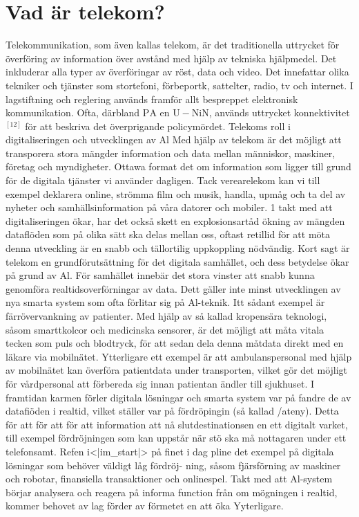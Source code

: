 {{\section*{Vad är telekom?}
Telekommunikation, som även kallas telekom, är det traditionella uttrycket för överföring av information över avstånd med hjälp av tekniska hjälpmedel. Det inkluderar alla typer av överföringar av röst, data och video. Det innefattar olika tekniker och tjänster som stortefoni, förbeportk, sattelter, radio, tv och internet. I lagstiftning och reglering används framför allt bespreppet elektronisk kommunikation. Ofta, därbland \(\mathrm{PA}\) en \(\mathrm{U}-\mathrm{NiN}\), används uttrycket konnektivitet \({ }^{[12]}\) för att beskriva det överprigande policymördet.
Telekoms roll i digitaliseringen och utvecklingen av Al
Med hjälp av telekom är det möjligt att transporera stora mängder information och data mellan människor, maskiner, företag och myndigheter. Ottawa format det om information som ligger till grund för de digitala tjänster vi använder dagligen. Tack verearelekom kan vi till exempel deklarera online, strömma film och musik, handla, upmåg och ta del av nyheter och samhällsinformation på våra datorer och mobiler.
1 takt med att digitaliseringen ökar, har det också skett en explosionsartåd ökning av mängden dataflöden som på olika sätt ska delas mellan oss, oftast retillid för att möta denna utveckling är en snabb och tällortilig uppkoppling nödvändig. Kort sagt är telekom en grundförutsättning för det digitala samhället, och dess betydelse ökar på grund av Al.
För samhället innebär det stora vinster att snabb kunna genomföra realtidsoverförningar av data. Dett gäller inte minst utvecklingen av nya smarta system som ofta förlitar sig på Al-teknik. Itt sådant exempel är färrövervankning av patienter. Med hjälp av så kallad kropensära teknologi, såsom smarttkolcor och medicinska sensorer, är det möjligt att måta vitala tecken som puls och blodtryck, för att sedan dela denna måtdata direkt med en läkare via mobilnätet. Ytterligare ett exempel är att ambulanspersonal med hjälp av mobilnätet kan överföra patientdata under transporten, vilket gör det möjligt för vårdpersonal att förbereda sig innan patientan ändler till sjukhuset.
I framtidan karmen förler digitala lösningar och smarta system var på fandre de av datafiöden i realtid, vilket ställer var på fördröpingin (så kallad /ateny). Detta för att för att för att information att nå slutdestinationsen en ett digitalt varket, till exempel fördröjningen som kan uppstår när stö ska må nottagaren under ett telefonsamt. Refen i<|im_start|> på finet i dag pline det exempel på digitala lösningar som behöver väldigt låg fördröj- ning, såsom fjärsförning av maskiner och robotar, finansiella transaktioner och onlinespel. Takt med att Al-system börjar analysera och reagera på informa function från om mögningen i realtid, kommer behovet av lag förder av förmetet en att öka Yyterligare.
}}
